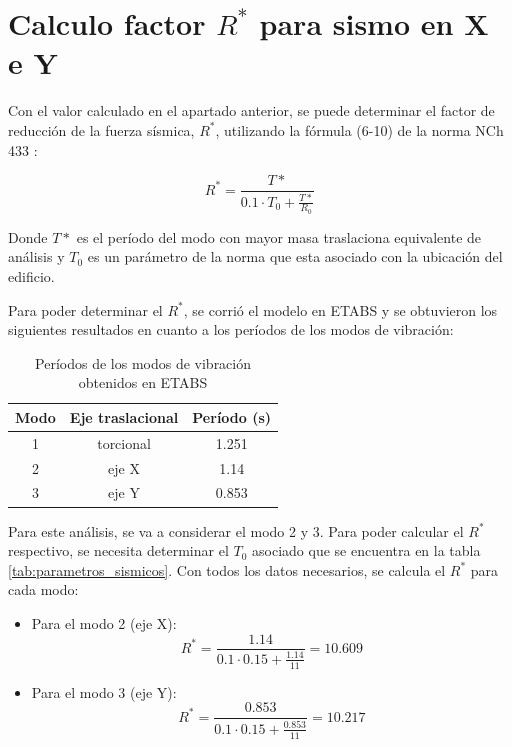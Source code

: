 \section{Calculo factor $R^*$ para sismo en X e Y}
Con el valor calculado en el apartado anterior, se puede determinar el factor de reducción de la fuerza sísmica, $R^*$, utilizando la fórmula (6-10) de la norma NCh 433 \cite{NCh433:1996}:

\begin{equation}
    R^* = \frac{T*}{0.1 \cdot T_0 + \frac{T*}{R_0}}
\end{equation}

Donde $T*$ es el período del modo con mayor masa traslaciona equivalente de análisis y $T_0$ es un parámetro de la norma que esta asociado con la ubicación del edificio.

Para poder determinar el $R^*$, se corrió el modelo en ETABS y se obtuvieron los siguientes resultados en cuanto a los períodos de los modos de vibración:

\begin{table}[H]
    \centering
    \begin{tabular}{ccc}

        Modo  & Eje traslacional & Período (s) \\
        \hline
        1 & torcional & 1.251 \\
        2 & eje X & 1.14 \\
        3 & eje Y & 0.853 \\
    \end{tabular}
    \caption{Períodos de los modos de vibración obtenidos en ETABS}
    \label{tab:periodos}
\end{table}

Para este análisis, se va a considerar el modo 2 y 3. Para poder calcular el $R^*$ respectivo, se necesita determinar el $T_0$ asociado que se encuentra en la tabla \ref{tab:parametros_sismicos}. Con todos los datos necesarios, se calcula el $R^*$ para cada modo:
\begin{itemize}
    \item Para el modo 2 (eje X):
    \begin{equation}
        R^* = \frac{1.14}{0.1 \cdot 0.15 + \frac{1.14}{11}} = 10.609
    \end{equation}

    \item Para el modo 3 (eje Y):
    \begin{equation}
        R^* = \frac{0.853}{0.1 \cdot 0.15 + \frac{0.853}{11}} = 10.217
    \end{equation}
\end{itemize}

